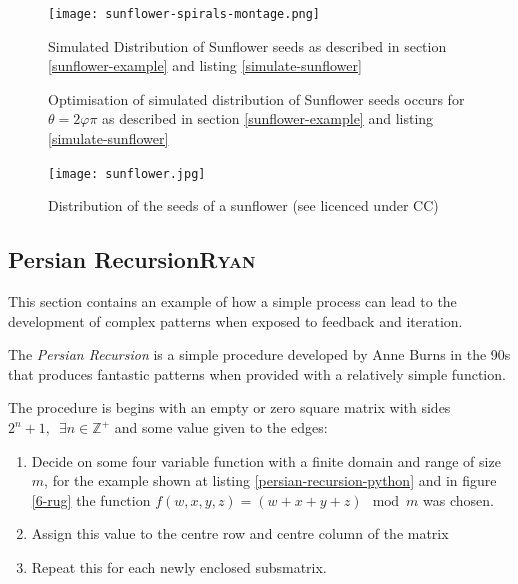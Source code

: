 \documentclass[11pt]{article}
\begin{document}
\begin{figure}[htbp]
\centering
\texttt{[image: sunflower-spirals-montage.png]}
\caption{\label{simulate-sunflower-image}Simulated Distribution of Sunflower seeds as described in section \ref{sunflower-example} and listing \ref{simulate-sunflower}}
\end{figure}

\begin{figure}[htbp]
\centering

\caption{\label{simulate-sunflower-phi}Optimisation of simulated distribution of Sunflower seeds occurs for \(\theta =2 \varphi  \pi\) as described in section \ref{sunflower-example} and listing \ref{simulate-sunflower}}
\end{figure}


\begin{figure}[htbp]
\centering
\texttt{[image: sunflower.jpg]}
\caption{\label{sunflower}Distribution of the seeds of a sunflower (see \cite{simonbrassCCSearch2006} licenced under CC)}
\end{figure}

\subsection{Persian Recursion\hfill{}\textsc{Ryan}}
\label{sec:org3dde95a}
This section contains an example of how a simple process can lead to the
development of complex patterns when exposed to feedback and iteration.

The \emph{Persian Recursion} is a simple procedure developed by Anne Burns in the 90s
\cite{burnsPersianRecursion1997} that produces fantastic patterns when provided
with a relatively simple function.

The procedure is begins with an empty or zero square matrix with sides \(2^{n}+1,
\enspace \exists n\in \mathbb{Z}^{+}\) and some value given to the edges:

\begin{enumerate}
\item Decide on some four variable function with a finite domain and range of size \(m\), for the example shown at listing \ref{persian-recursion-python} and in figure \ref{6-rug} the function \(f(w,x,y,z)=(w+x+y+z) \mod m\) was chosen.
\item Assign this value to the centre row and centre column of the matrix
\item Repeat this for each newly enclosed subsmatrix.
\end{enumerate}
\end{document}
